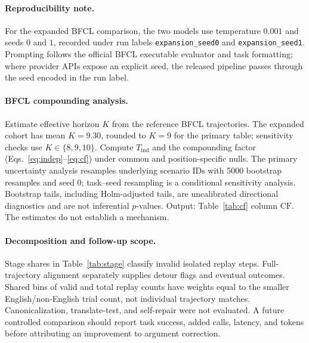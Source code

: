 \documentclass[11pt]{article}
\begin{document}
\paragraph{Reproducibility note.} For the expanded BFCL comparison, the two
models use temperature $0.001$ and seeds $0$ and $1$, recorded under run
labels \texttt{expansion\_seed0} and \texttt{expansion\_seed1}. Prompting
follows the official BFCL executable evaluator and task formatting; where
provider APIs expose an explicit seed, the released pipeline passes through
the seed encoded in the run label.

\paragraph{BFCL compounding analysis.} Estimate effective horizon $K$ from the
reference BFCL trajectories. The expanded cohort has mean $K=9.30$, rounded to
$K=9$ for the primary table; sensitivity checks use $K\in\{8,9,10\}$. Compute
$T_{\mathrm{ind}}$ and the compounding factor (Eqs.~\ref{eq:indep}--\ref{eq:cf})
under common and position-specific nulls. The primary uncertainty
analysis resamples underlying scenario IDs with 5000 bootstrap resamples and
seed $0$; task--seed resampling is a conditional sensitivity analysis.
Bootstrap tails, including Holm-adjusted tails, are uncalibrated directional
diagnostics and are not inferential $p$-values. Output: Table~\ref{tab:cf}
column $\mathrm{CF}$. The estimates do not establish a mechanism.

\paragraph{Decomposition and follow-up scope.} Stage shares in
Table~\ref{tab:stage} classify invalid isolated replay steps. Full-trajectory
alignment separately supplies detour flags and eventual outcomes. Shared
bins of valid and total replay counts have weights equal to the smaller
English/non-English trial count, not individual trajectory matches.
Canonicalization, translate-test, and self-repair were not evaluated. A
future controlled comparison should report task success, added calls, latency,
and tokens before attributing an improvement to argument correction.
\end{document}
